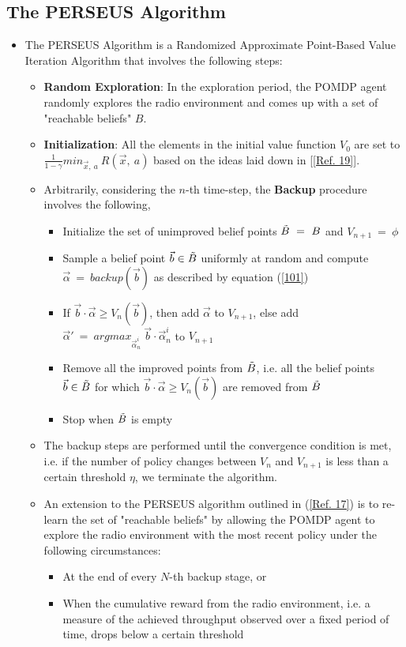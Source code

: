 \documentclass[12pt, draftcls, onecolumn]{IEEEtran}
\begin{document}
\subsection{The PERSEUS Algorithm}
\begin{itemize}
    \item The PERSEUS Algorithm is a Randomized Approximate Point-Based Value Iteration Algorithm that involves the following steps:
    \begin{itemize}
        \item \textbf{Random Exploration}: In the exploration period, the POMDP agent randomly explores the radio environment and comes up with a set of "reachable beliefs" $B$.
        \item \textbf{Initialization}: All the elements in the initial value function $V_0$ are set to $\frac{1}{1-\gamma}min_{\vec{x},\ a}\ R(\vec{x},\ a)$ based on the ideas laid down in [\ref{Ref. 19}].
        \item Arbitrarily, considering the $n$-th time-step, the \textbf{Backup} procedure involves the following,
        \begin{itemize}
            \item Initialize the set of unimproved belief points $\Tilde{B}\ =\ B$ and $V_{n+1}\ =\ \phi$
            \item Sample a belief point $\vec{b} \in \Tilde{B}$ uniformly at random and compute $\vec{\alpha}\ =\ backup(\vec{b})$ as described by equation (\ref{101})
            \item If $\vec{b} \cdot \vec{\alpha} \geq V_n(\vec{b})$, then add $\vec{\alpha}$ to $V_{n+1}$, else add $\vec{\alpha}'\ =\ argmax_{\vec{\alpha}_n^i}\ \vec{b} \cdot \vec{\alpha}_n^i$ to $V_{n+1}$
            \item Remove all the improved points from $\Tilde{B}$, i.e. all the belief points $\vec{b} \in \Tilde{B}$ for which $\vec{b} \cdot \vec{\alpha} \geq V_n(\vec{b})$ are removed from $\Tilde{B}$
            \item Stop when $\Tilde{B}$ is empty
        \end{itemize}
        \item The backup steps are performed until the convergence condition is met, i.e. if the number of policy changes between $V_{n}$ and $V_{n+1}$ is less than a certain threshold $\eta$, we terminate the algorithm.
        \item An extension to the PERSEUS algorithm outlined in (\ref{Ref. 17}) is to re-learn the set of "reachable beliefs" by allowing the POMDP agent to explore the radio environment with the most recent policy under the following circumstances:
        \begin{itemize}
            \item At the end of every $N$-th backup stage, or
            \item When the cumulative reward from the radio environment, i.e. a measure of the achieved throughput observed over a fixed period of time, drops below a certain threshold
        \end{itemize}
    \end{itemize}
\end{itemize}
\end{document}
